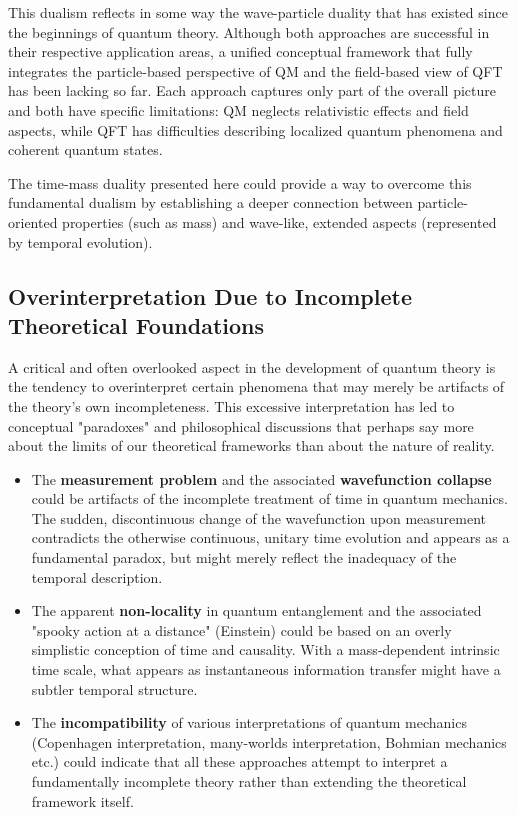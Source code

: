 \documentclass[12pt,a4paper]{article}  %
\begin{document}
	This dualism reflects in some way the wave-particle duality that has existed since the beginnings of quantum theory. Although both approaches are successful in their respective application areas, a unified conceptual framework that fully integrates the particle-based perspective of QM and the field-based view of QFT has been lacking so far. Each approach captures only part of the overall picture and both have specific limitations: QM neglects relativistic effects and field aspects, while QFT has difficulties describing localized quantum phenomena and coherent quantum states.
	
	The time-mass duality presented here could provide a way to overcome this fundamental dualism by establishing a deeper connection between particle-oriented properties (such as mass) and wave-like, extended aspects (represented by temporal evolution).
	
	\subsection{Overinterpretation Due to Incomplete Theoretical Foundations}
	
	A critical and often overlooked aspect in the development of quantum theory is the tendency to overinterpret certain phenomena that may merely be artifacts of the theory's own incompleteness. This excessive interpretation has led to conceptual "paradoxes" and philosophical discussions that perhaps say more about the limits of our theoretical frameworks than about the nature of reality.
	
	\begin{itemize}
		\item The \textbf{measurement problem} and the associated \textbf{wavefunction collapse} could be artifacts of the incomplete treatment of time in quantum mechanics. The sudden, discontinuous change of the wavefunction upon measurement contradicts the otherwise continuous, unitary time evolution and appears as a fundamental paradox, but might merely reflect the inadequacy of the temporal description.
		
		\item The apparent \textbf{non-locality} in quantum entanglement and the associated "spooky action at a distance" (Einstein) could be based on an overly simplistic conception of time and causality. With a mass-dependent intrinsic time scale, what appears as instantaneous information transfer might have a subtler temporal structure.
		
		\item The \textbf{incompatibility} of various interpretations of quantum mechanics (Copenhagen interpretation, many-worlds interpretation, Bohmian mechanics etc.) could indicate that all these approaches attempt to interpret a fundamentally incomplete theory rather than extending the theoretical framework itself.
	\end{itemize}
	
\end{document}
